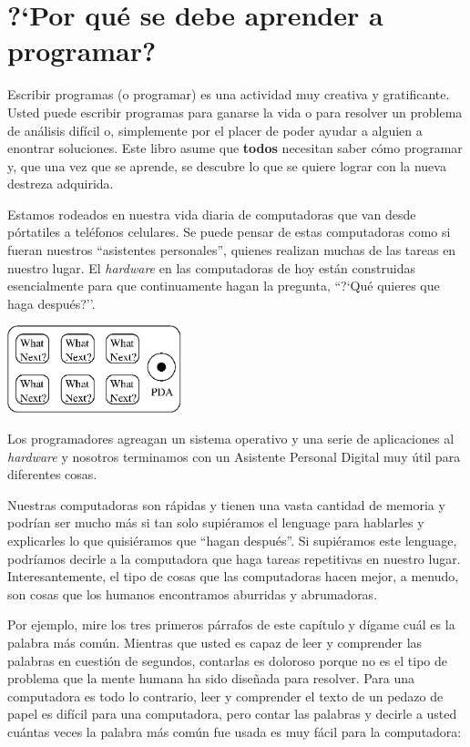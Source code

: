 
\chapter{?`Por qu\'e se debe aprender a programar?}

Escribir programas (o programar) es una actividad muy creativa y gratificante. Usted puede escribir programas para ganarse la vida o para resolver un problema de an\'alisis dif\'icil o, simplemente por el placer de poder ayudar a alguien a enontrar soluciones. Este libro asume que \textbf{todos} necesitan saber c\'omo programar y, que una vez que se aprende, se descubre lo que se quiere lograr con la nueva destreza adquirida.  

Estamos rodeados en nuestra vida diaria de computadoras que van desde p\'ortatiles a tel\'efonos celulares. Se puede pensar de estas computadoras como si fueran nuestros ``asistentes personales'', quienes realizan muchas de las tareas en nuestro lugar. El \textit{hardware} en las computadoras de hoy est\'an construidas esencialmente para que continuamente hagan la pregunta, 
``?`Qu\'e quieres que haga despu\'es?''.

\beforefig
\centerline{\includegraphics[height=1.00in]{figs2/pda.eps}}
\afterfig

Los programadores agreagan un sistema operativo y una serie de aplicaciones al \textit{hardware} y nosotros terminamos con un Asistente Personal Digital muy \'util para diferentes cosas.

Nuestras computadoras son r\'apidas y tienen una vasta cantidad de memoria y podr\'ian ser mucho m\'as si tan solo supi\'eramos el lenguage para hablarles y explicarles lo que quisi\'eramos que ``hagan despu\'es''. Si supi\'eramos este lenguage, podr\'iamos decirle a la computadora que haga tareas repetitivas en nuestro lugar. Interesantemente, el tipo de cosas que las computadoras hacen mejor, a menudo, son cosas que los humanos encontramos aburridas y abrumadoras.

Por ejemplo, mire los tres primeros p\'arrafos de este cap\'itulo y d\'igame cu\'al es la palabra m\'as com\'un. Mientras que usted es capaz de leer y comprender las palabras en cuesti\'on de segundos, contarlas es doloroso porque no es el tipo de problema que la mente humana ha sido dise\~nada para resolver. Para una computadora es todo lo contrario, leer y comprender el texto de un pedazo de papel es dif\'icil para una computadora, pero contar las palabras y decirle a usted cu\'antas veces la palabra m\'as com\'un fue usada es muy f\'acil para la computadora:

